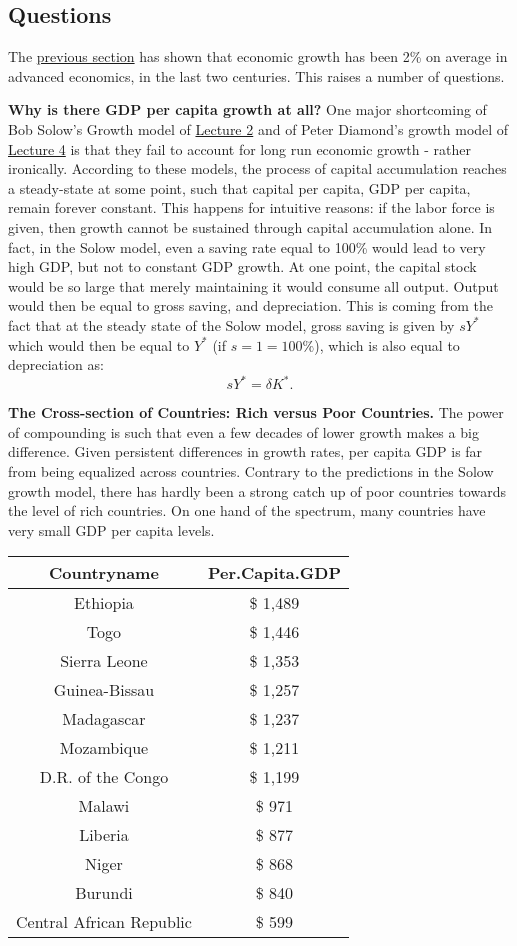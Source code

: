 \documentclass[]{book}
\theoremstyle{definition}
\theoremstyle{definition}
\theoremstyle{definition}
\theoremstyle{remark}
\begin{document}
\subsection{Questions}\label{questions}

The \protect\hyperlink{long-run-growth}{previous section} has shown that
economic growth has been 2\% on average in advanced economics, in the
last two centuries. This raises a number of questions.

\textbf{Why is there GDP per capita growth at all?} One major
shortcoming of Bob Solow's Growth model of
\protect\hyperlink{solow}{Lecture 2} and of Peter Diamond's growth model
of \protect\hyperlink{olg}{Lecture 4} is that they fail to account for
long run economic growth - rather ironically. According to these models,
the process of capital accumulation reaches a steady-state at some
point, such that capital per capita, GDP per capita, remain forever
constant. This happens for intuitive reasons: if the labor force is
given, then growth cannot be sustained through capital accumulation
alone. In fact, in the Solow model, even a saving rate equal to 100\%
would lead to very high GDP, but not to constant GDP growth. At one
point, the capital stock would be so large that merely maintaining it
would consume all output. Output would then be equal to gross saving,
and depreciation. This is coming from the fact that at the steady state
of the Solow model, gross saving is given by \(s Y^{*}\) which would
then be equal to \(Y^{*}\) (if \(s=1=100\%\)), which is also equal to
depreciation as: \[s Y^{*}=\delta K^{*}.\]

\textbf{The Cross-section of Countries: Rich versus Poor Countries.} The
power of compounding is such that even a few decades of lower growth
makes a big difference. Given persistent differences in growth rates,
per capita GDP is far from being equalized across countries. Contrary to
the predictions in the Solow growth model, there has hardly been a
strong catch up of poor countries towards the level of rich countries.
On one hand of the spectrum, many countries have very small GDP per
capita levels.

\begin{tabular}{c|c}
\hline
Countryname & Per.Capita.GDP\\
\hline
Ethiopia & \$ 1,489\\
\hline
Togo & \$ 1,446\\
\hline
Sierra Leone & \$ 1,353\\
\hline
Guinea-Bissau & \$ 1,257\\
\hline
Madagascar & \$ 1,237\\
\hline
Mozambique & \$ 1,211\\
\hline
D.R. of the Congo & \$ 1,199\\
\hline
Malawi & \$ 971\\
\hline
Liberia & \$ 877\\
\hline
Niger & \$ 868\\
\hline
Burundi & \$ 840\\
\hline
Central African Republic & \$ 599\\
\hline
\end{tabular}
\end{document}
